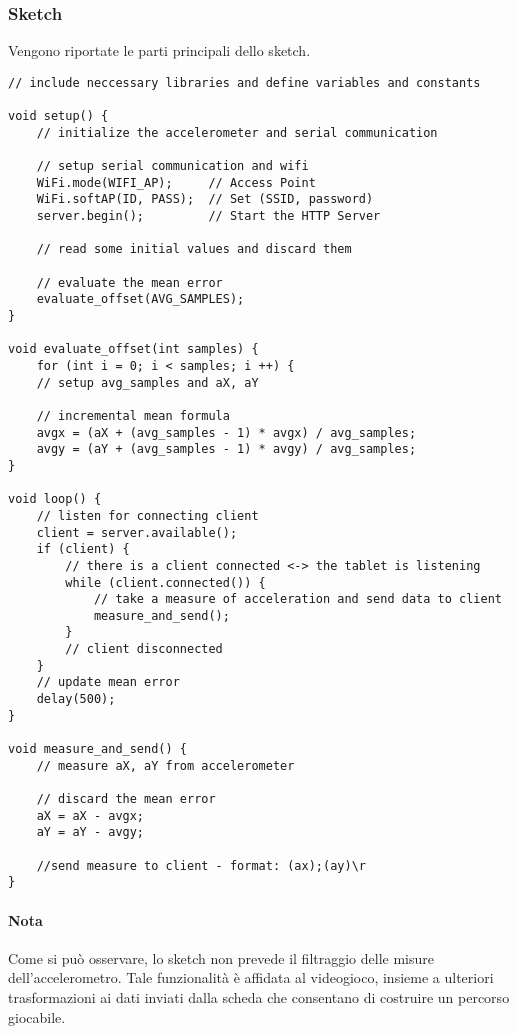 \documentclass[documentation.tex]{subfiles}
\begin{document}
	\subsubsection{Sketch}
	Vengono riportate le parti principali dello sketch.
	
	\begin{lstlisting}[language=Arduino]
// include neccessary libraries and define variables and constants
	
void setup() {
	// initialize the accelerometer and serial communication
  	
  	// setup serial communication and wifi
  	WiFi.mode(WIFI_AP); 	// Access Point
  	WiFi.softAP(ID, PASS); 	// Set (SSID, password)
  	server.begin(); 		// Start the HTTP Server
 
  	// read some initial values and discard them
  
  	// evaluate the mean error
  	evaluate_offset(AVG_SAMPLES);
}
	
void evaluate_offset(int samples) {
  	for (int i = 0; i < samples; i ++) {
    // setup avg_samples and aX, aY
    
    // incremental mean formula
    avgx = (aX + (avg_samples - 1) * avgx) / avg_samples;
    avgy = (aY + (avg_samples - 1) * avgy) / avg_samples;
}
  	
void loop() {
  	// listen for connecting client
  	client = server.available();
  	if (client) {
    	// there is a client connected <-> the tablet is listening
    	while (client.connected()) {
      		// take a measure of acceleration and send data to client
      		measure_and_send();
    	}
    	// client disconnected
  	}
  	// update mean error
  	delay(500);
}

void measure_and_send() {
  	// measure aX, aY from accelerometer

	// discard the mean error
  	aX = aX - avgx;
  	aY = aY - avgy;

  	//send measure to client - format: (ax);(ay)\r
}
	\end{lstlisting}
	
	\paragraph{Nota} Come si può osservare, lo sketch non prevede il filtraggio delle misure dell'accelerometro. Tale funzionalità è affidata al videogioco, insieme a ulteriori trasformazioni ai dati inviati dalla scheda che consentano di costruire un percorso giocabile.
\end{document}
